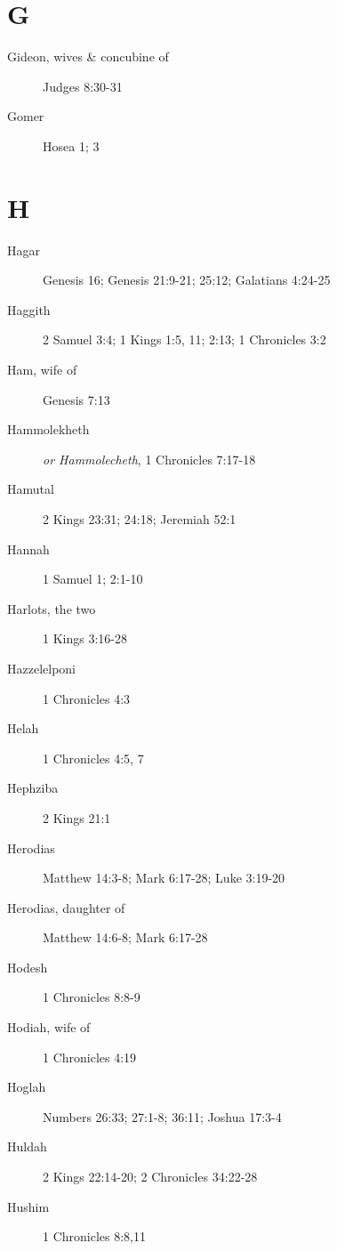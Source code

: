 \documentclass[12pt,letter,twoside,openany]{extbook}
\begin{document}
\chapter*{G}
\begin{description}
	\item [Gideon, wives \& concubine of] Judges 8:30-31
	\item [Gomer] Hosea 1; 3
\end{description}


\chapter*{H}
\begin{description}
	\item [Hagar] Genesis 16; Genesis 21:9-21; 25:12; Galatians 4:24-25
	\item [Haggith] 2 Samuel 3:4; 1 Kings 1:5, 11; 2:13; 1 Chronicles 3:2
	\item [Ham, wife of] Genesis 7:13
	\item [Hammolekheth] \textit{or Hammolecheth}, 1 Chronicles 7:17-18
	\item [Hamutal] 2 Kings 23:31; 24:18; Jeremiah 52:1
	\item [Hannah] 1 Samuel 1; 2:1-10
	\item [Harlots, the two] 1 Kings 3:16-28
	\item [Hazzelelponi] 1 Chronicles 4:3
	\item [Helah] 1 Chronicles 4:5, 7
	\item [Hephziba] 2 Kings 21:1
	\item [Herodias] Matthew 14:3-8; Mark 6:17-28; Luke 3:19-20
	\item [Herodias, daughter of\footnotemark{}]
	  Matthew 14:6-8; Mark 6:17-28
	\item [Hodesh] 1 Chronicles 8:8-9
	\item [Hodiah, wife of] 1 Chronicles 4:19
	\item [Hoglah] Numbers 26:33; 27:1-8; 36:11; Joshua 17:3-4
	\item [Huldah] 2 Kings 22:14-20; 2 Chronicles 34:22-28
	\item [Hushim] 1 Chronicles 8:8,11
\end{description}
\end{document}
